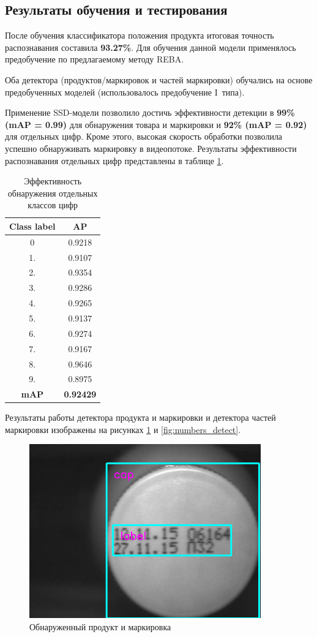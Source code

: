 \subsection{Результаты обучения и тестирования} 
После обучения классификатора положения продукта итоговая точность распознавания составила \textbf{93.27\%}. Для обучения данной модели применялось предобучение по предлагаемому методу REBA.

Оба детектора (продуктов/маркировок и частей маркировки) обучались на основе предобученных моделей (использовалось предобучение I~типа).

Применение SSD-модели позволило достичь эффективности детекции в \textbf{99\% (mAP = 0.99)} для обнаружения товара и маркировки и \textbf{92\% (mAP = 0.92)} для отдельных цифр. Кроме этого, высокая скорость обработки позволила успешно обнаруживать маркировку в видеопотоке. Результаты эффективности распознавания отдельных цифр представлены в таблице \ref{tab:efficiency_detector1}.  

\begin{table}[h]
\caption{Эффективность обнаружения отдельных классов цифр}
\centering
\begin{tabular}{ | c | c |  }
\hline
Class label & AP \\ \hline
0 & 0.9218\\
1. & 0.9107\\
2. & 0.9354\\
3. & 0.9286\\
4. & 0.9265\\
5. & 0.9137\\
6. & 0.9274\\
7. & 0.9167\\
8. & 0.9646\\
9. & 0.8975\\
\hline
\textbf{mAP} & \textbf{0.92429}\\
\hline
\end{tabular}
\label{tab:efficiency_detector1}
\end{table}

Результаты работы детектора продукта и маркировки и детектора частей маркировки изображены на рисунках \ref{fig:product_detect}  и \ref{fig:numbers_detect}.

\begin{figure}[!ht]
	\centering
	\includegraphics[width=10cm]{man-source/images/ch4/pic4-25.png}
	\caption{Обнаруженный продукт и маркировка}
	\label{fig:product_detect}
\end{figure}

